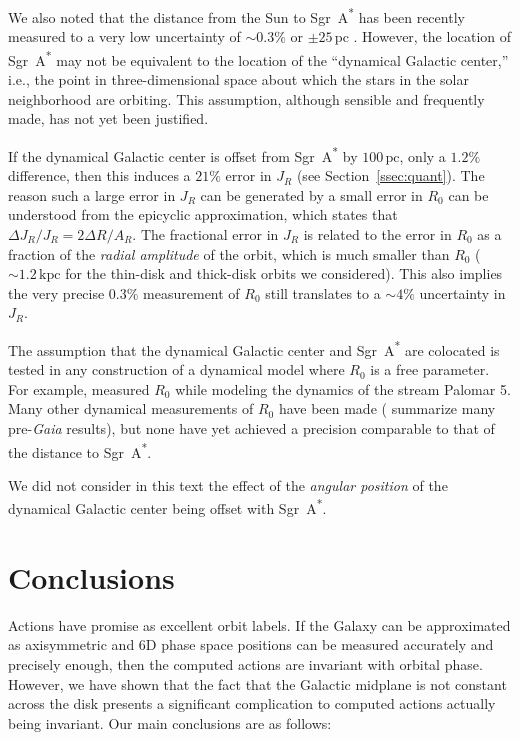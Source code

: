 \documentclass[twocolumn]{aastex62}
\newcommand{\pc}{\text{pc}}
\newcommand{\kpc}{\text{kpc}}
\newcommand{\sgra}{Sgr~A\textsuperscript{*}}
\begin{document}
We also noted that the distance from the Sun to \sgra{} has been recently
measured to a very low uncertainty of $\sim0.3\%$ or $\pm25\,\pc$
\citep{2019arXiv190405721A}. However, the location of \sgra{} may not be
equivalent to the location of the ``dynamical Galactic center,'' i.e., the
point in three-dimensional space about which the stars in the solar
neighborhood are orbiting. This assumption, although sensible and frequently
made, has not yet been justified.

If the dynamical Galactic center is offset from \sgra{} by $100\,\pc$, only a
$1.2\%$ difference, then this induces a $21\%$ error in $J_R$ (see
Section~\ref{ssec:quant}). The reason such a large error in $J_R$ can be
generated by a small error in $R_0$ can be understood from the epicyclic
approximation, which states that $\Delta J_R/J_R = 2\Delta R/A_R$. The
fractional error in $J_R$ is related to the error in $R_0$ as a fraction of
the {\em radial amplitude} of the orbit, which is much smaller than $R_0$
($\sim1.2\,\kpc$ for the thin-disk and thick-disk orbits we considered). This
also implies the very precise $0.3\%$ measurement of $R_0$ still translates to
a $\sim4\%$ uncertainty in $J_R$.

The assumption that the dynamical Galactic center and \sgra{} are colocated is
tested in any construction of a dynamical model where $R_0$ is a free
parameter. For example, \citet{2015ApJ...803...80K} measured $R_0$ while
modeling the dynamics of the stream Palomar 5. Many other dynamical
measurements of $R_0$ have been made (\citealt{2016ARAA..54..529B} summarize
many pre-\textit{Gaia} results), but none have yet achieved a precision
comparable to that of the distance to \sgra{}.

We did not consider in this text the effect of the \emph{angular position} of
the dynamical Galactic center being offset with \sgra{}.

\section{Conclusions}\label{sec:conclusion}
Actions have promise as excellent orbit labels. If the Galaxy can be
approximated as axisymmetric and 6D phase space positions can be measured
accurately and precisely enough, then the computed actions are invariant with
orbital phase. However, we have shown that the fact that the Galactic midplane
is not constant across the disk presents a significant complication to
computed actions actually being invariant. Our main conclusions are as
follows:
\end{document}
